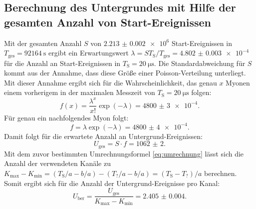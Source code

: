 \subsection{Berechnung des Untergrundes mit Hilfe der gesamten Anzahl von Start-Ereignissen}
\label{subsec:Berechnung}
Mit der gesamten Anzahl $S$ von $\num{2.213(2)e6}$ Start-Ereignissen in $T_\text{ges}=\SI{92164}{\second}$ ergibt ein Erwartungswert $\lambda=S T_\text{S}/T_\text{ges}=\num{4.802(3)e-4}$ für die Anzahl an Start-Ereignissen in $T_\text{S}=\SI{20}{\micro\second}$. Die Standardabweichung für $S$ kommt aus der Annahme, dass diese Größe einer Poisson-Verteilung unterliegt. Mit dieser Annahme ergibt sich für die Wahrscheinlichkeit, das genau $x$ Myonen einem vorherigem in der maximalen Messzeit von $T_\text{S}=\SI{20}{\micro\second}$ folgen: 
\begin{displaymath}
f(x)=\frac{\lambda^x}{x!}\exp(-\lambda)=\num{4800(3)e-4}.
\end{displaymath}
Für genau ein nachfolgendes Myon folgt:
\begin{displaymath}
f=\lambda\exp(-\lambda)=\num{4800(4)e-4}.
\end{displaymath}
Damit folgt für die erwartete Anzahl an Untergrund-Ereignissen:
\begin{displaymath}
U_\text{ges}=S \cdot f =\num{1062(2)}.
\end{displaymath}
Mit dem zuvor bestimmten Umrechnungsformel \eqref{eq:umrechnung} lässt sich die Anzahl der verwendeten Kanäle zu $K_\text{max}-K_\text{min}=(T_\text{S}/a -b/a)-(T_\text{?}/a-b/a)= (T_\text{S}-T_\text{?})/a$ berechnen.
Somit ergibt sich für die Anzahl der Untergrund-Ereignisse pro Kanal:
\begin{displaymath}
U_\text{ber}=\frac{U_\text{ges}}{K_\text{max}-K_\text{min}} =\num{2.405(4)}.
\end{displaymath}


